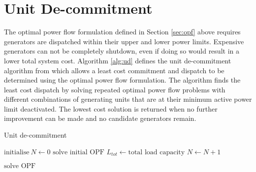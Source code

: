 \section{Unit De-commitment}
The optimal power flow formulation defined in Section \ref{sec:opf} above
requires generators are dispatched within their upper and lower power limits.
Expensive generators can not be completely shutdown, even if doing so would
result in a lower total system cost.  Algorithm \ref{alg:ud} defines the unit
de-commitment algorithm from \cite[p.20]{pserc:mp_manual} which allows a least
cost commitment and dispatch to be determined using the optimal power flow
formulation. The algorithm finds the least cost dispatch by solving repeated
optimal power flow problems with different combinations of generating units
that are at their minimum active power limit deactivated.  The lowest cost
solution is returned when no further improvement can be made and no candidate
generators remain.
\begin{algorithm}[H]
\caption{Unit de-commitment}
\label{alg:ud}
\begin{algorithmic}[1]
\STATE $\text{initialise}~N \leftarrow 0$
\STATE $\text{solve initial OPF}$
\STATE $L_{tot} \leftarrow \text{total load capacity}$
	\STATE $N \leftarrow N + 1$
\ENDWHILE

\REPEAT
		\STATE $\text{solve OPF}$
	\ENDFOR
{}
\end{algorithmic}
\end{algorithm}
